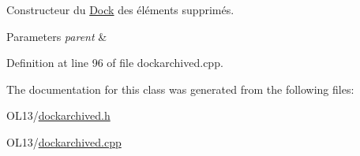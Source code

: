 Constructeur du \hyperlink{class_dock}{Dock} des éléments supprimés. 


\begin{DoxyParams}{Parameters}
{\em parent} & \\
\hline
\end{DoxyParams}


Definition at line 96 of file dockarchived.\+cpp.



The documentation for this class was generated from the following files\+:\begin{DoxyCompactItemize}
\item 
O\+L13/\hyperlink{dockarchived_8h}{dockarchived.\+h}\item 
O\+L13/\hyperlink{dockarchived_8cpp}{dockarchived.\+cpp}\end{DoxyCompactItemize}
